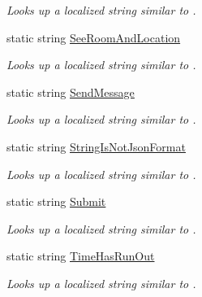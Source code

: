 \begin{DoxyCompactItemize}
\begin{DoxyCompactList}\small\item\em Looks up a localized string similar to . \end{DoxyCompactList}\item 
static string \hyperlink{class_wis_r_1_1_app___resources_1_1_resource_a566f3afb03fc964af58017fafdf5ef7e}{See\+Room\+And\+Location}
\begin{DoxyCompactList}\small\item\em Looks up a localized string similar to . \end{DoxyCompactList}\item 
static string \hyperlink{class_wis_r_1_1_app___resources_1_1_resource_ad52c085c285fa0c4c76c351fdefa0011}{Send\+Message}
\begin{DoxyCompactList}\small\item\em Looks up a localized string similar to . \end{DoxyCompactList}\item 
static string \hyperlink{class_wis_r_1_1_app___resources_1_1_resource_a4ba315e470472270fba017accb6fc593}{String\+Is\+Not\+Json\+Format}
\begin{DoxyCompactList}\small\item\em Looks up a localized string similar to . \end{DoxyCompactList}\item 
static string \hyperlink{class_wis_r_1_1_app___resources_1_1_resource_ad31b72feacf7770e9cf8991706c00cd4}{Submit}
\begin{DoxyCompactList}\small\item\em Looks up a localized string similar to . \end{DoxyCompactList}\item 
static string \hyperlink{class_wis_r_1_1_app___resources_1_1_resource_af08204b37e23a188b074f0e1225d95c4}{Time\+Has\+Run\+Out}
\begin{DoxyCompactList}\small\item\em Looks up a localized string similar to . \end{DoxyCompactList}\item 

\end{DoxyCompactItemize}
